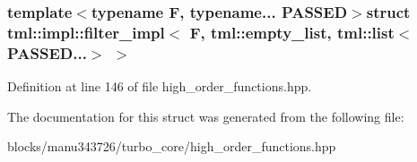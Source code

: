 \subsubsection*{template$<$typename F, typename... P\+A\+S\+S\+E\+D$>$struct tml\+::impl\+::filter\+\_\+impl$<$ F, tml\+::empty\+\_\+list, tml\+::list$<$ P\+A\+S\+S\+E\+D...$>$ $>$}



Definition at line 146 of file high\+\_\+order\+\_\+functions.\+hpp.



The documentation for this struct was generated from the following file\+:\begin{DoxyCompactItemize}
\item 
blocks/manu343726/turbo\+\_\+core/high\+\_\+order\+\_\+functions.\+hpp\end{DoxyCompactItemize}
